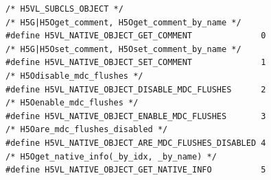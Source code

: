 \begin{lstlisting}
/* H5VL_SUBCLS_OBJECT */
/* H5G|H5Oget_comment, H5Oget_comment_by_name */
#define H5VL_NATIVE_OBJECT_GET_COMMENT              0 
/* H5G|H5Oset_comment, H5Oset_comment_by_name */
#define H5VL_NATIVE_OBJECT_SET_COMMENT              1 
/* H5Odisable_mdc_flushes */
#define H5VL_NATIVE_OBJECT_DISABLE_MDC_FLUSHES      2 
/* H5Oenable_mdc_flushes */
#define H5VL_NATIVE_OBJECT_ENABLE_MDC_FLUSHES       3 
/* H5Oare_mdc_flushes_disabled */
#define H5VL_NATIVE_OBJECT_ARE_MDC_FLUSHES_DISABLED 4 
/* H5Oget_native_info(_by_idx, _by_name) */
#define H5VL_NATIVE_OBJECT_GET_NATIVE_INFO          5 
\end{lstlisting}
